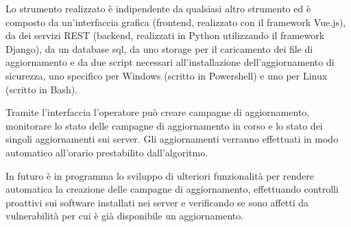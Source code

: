 Lo strumento realizzato è indipendente da qualsiasi altro strumento ed è composto 
da un’interfaccia grafica (frontend, realizzato con il framework Vue.js), da dei 
servizi REST (backend, realizzati in Python utilizzando il framework Django), 
da un database sql, da uno storage per il caricamento dei file di aggiornamento e 
da due script necessari all’installazione dell’aggiornamento di sicurezza, 
uno specifico per Windows (scritto in Powershell) e uno per Linux (scritto in Bash).
\newline

Tramite l’interfaccia l’operatore può creare campagne di aggiornamento, monitorare 
lo stato delle campagne di aggiornamento in corso e lo stato dei singoli 
aggiornamenti sui server. Gli aggiornamenti verranno effettuati in modo automatico 
all’orario prestabilito dall’algoritmo.
\newline

In futuro è in programma lo sviluppo di ulteriori funzionalità per rendere 
automatica la creazione delle campagne di aggiornamento, effettuando controlli 
proattivi sui software installati nei server e verificando se sono affetti da 
vulnerabilità per cui è già disponibile un aggiornamento.

